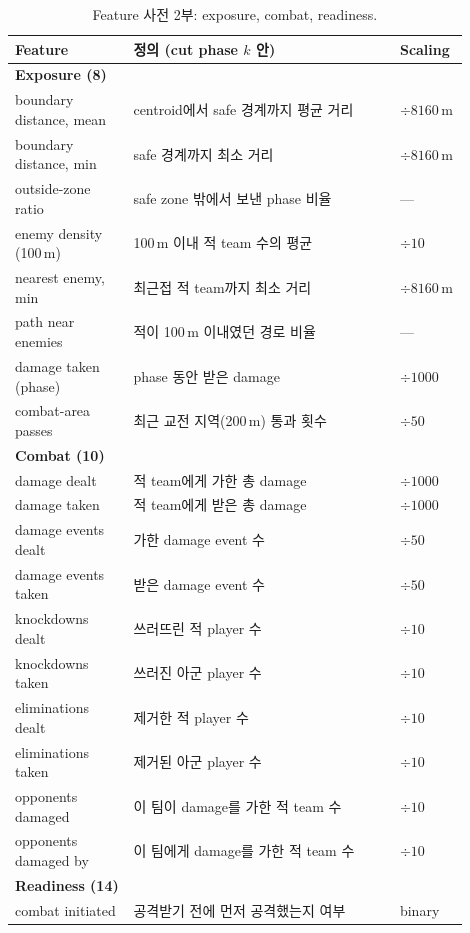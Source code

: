 \begin{table}[t]
\centering
\caption{Feature 사전 2부: exposure, combat, readiness.}
\label{tab:feat-dict-b}
\footnotesize
\begin{tabular}{p{0.24\linewidth}p{0.54\linewidth}p{0.12\linewidth}}
\toprule
Feature & 정의 (cut phase \(k\) 안) & Scaling \\
\midrule
\multicolumn{3}{l}{\textbf{Exposure (8)}} \\
boundary distance, mean & centroid에서 safe 경계까지 평균 거리 & \(\div 8160\)\,m \\
boundary distance, min & safe 경계까지 최소 거리 & \(\div 8160\)\,m \\
outside-zone ratio & safe zone 밖에서 보낸 phase 비율 & --- \\
enemy density (100\,m) & 100\,m 이내 적 team 수의 평균 & \(\div 10\) \\
nearest enemy, min & 최근접 적 team까지 최소 거리 & \(\div 8160\)\,m \\
path near enemies & 적이 100\,m 이내였던 경로 비율 & --- \\
damage taken (phase) & phase 동안 받은 damage & \(\div 1000\) \\
combat-area passes & 최근 교전 지역(200\,m) 통과 횟수 & \(\div 50\) \\
\midrule
\multicolumn{3}{l}{\textbf{Combat (10)}} \\
damage dealt & 적 team에게 가한 총 damage & \(\div 1000\) \\
damage taken & 적 team에게 받은 총 damage & \(\div 1000\) \\
damage events dealt & 가한 damage event 수 & \(\div 50\) \\
damage events taken & 받은 damage event 수 & \(\div 50\) \\
knockdowns dealt & 쓰러뜨린 적 player 수 & \(\div 10\) \\
knockdowns taken & 쓰러진 아군 player 수 & \(\div 10\) \\
eliminations dealt & 제거한 적 player 수 & \(\div 10\) \\
eliminations taken & 제거된 아군 player 수 & \(\div 10\) \\
opponents damaged & 이 팀이 damage를 가한 적 team 수 & \(\div 10\) \\
opponents damaged by & 이 팀에게 damage를 가한 적 team 수 & \(\div 10\) \\
\midrule
\multicolumn{3}{l}{\textbf{Readiness (14)}} \\
combat initiated & 공격받기 전에 먼저 공격했는지 여부 & binary \\

\end{tabular}
\end{table}
